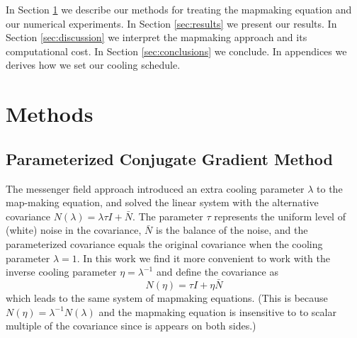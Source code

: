 \documentclass[twocolumn,linenumbers]{aastex631}
\DeclareMathOperator*{\argmin}{arg\,min}
\newcommand{\vbd}{\vb{d}}
\newcommand{\vbm}{\vb{m}}
\newcommand{\vbn}{\vb{n}}
\newcommand{\inv}[1]{#1^{-1}}
\newcommand{\hatm}{\vb{\hat{m}}}
\newcommand{\Pdagger}{P^{\dagger}}
\newcommand{\Nbar}{\bar{N}}
\newcommand{\PPinv}[1]{\inv{\qty(\Pdagger #1 P)}}
\begin{document}




In Section \ref{sec:methods} we describe our methods for treating the mapmaking equation and our numerical experiments.  In Section \ref{sec:results} we present our results. In Section \ref{sec:discussion} we interpret the mapmaking approach and its computational cost.  In Section \ref{sec:conclusions} we conclude.  In appendices we derives how we set our cooling schedule.


\section{Methods}\label{sec:methods}

\subsection{Parameterized Conjugate Gradient Method}
The messenger field approach introduced an extra cooling parameter $\lambda$ to the
map-making equation, and solved the linear system with the alternative covariance $N(\lambda) =  \lambda \tau I + \Nbar $.  The parameter $\tau$ represents the uniform level of (white) noise in the covariance, $\Nbar$ is the balance of the noise, and the parameterized covariance equals the original covariance when the cooling parameter $\lambda = 1$.  In this work we find it more convenient to work with the inverse cooling parameter $\eta = \lambda^{-1}$ and define the covariance as
\begin{equation}
  N(\eta) = \tau I +  \eta \Nbar 
\end{equation}
which leads to the same system of mapmaking equations.  (This is because $N(\eta) = \lambda^{-1} N(\lambda)$ and the mapmaking equation is insensitive to to scalar multiple of the covariance since is appears on both sides.)
\end{document}
